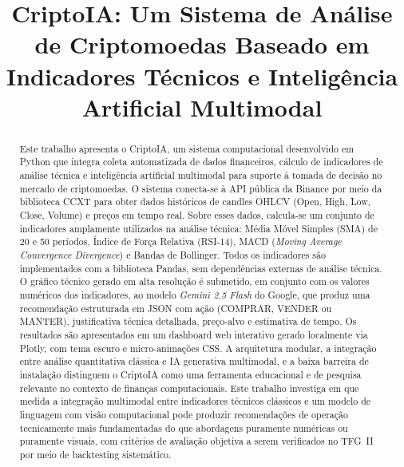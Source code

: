 \documentclass[conference]{IEEEtran}
\begin{document}
\title{CriptoIA: Um Sistema de Análise de Criptomoedas Baseado em\\
       Indicadores Técnicos e Inteligência Artificial Multimodal}

\author{
  \and
}

\maketitle

\begin{abstract}
Este trabalho apresenta o CriptoIA, um sistema computacional desenvolvido em Python que integra coleta automatizada de dados financeiros, cálculo de indicadores de análise técnica e inteligência artificial multimodal para suporte à tomada de decisão no mercado de criptomoedas. O sistema conecta-se à API pública da Binance por meio da biblioteca CCXT para obter dados históricos de candles OHLCV (Open, High, Low, Close, Volume) e preços em tempo real. Sobre esses dados, calcula-se um conjunto de indicadores amplamente utilizados na análise técnica: Média Móvel Simples (SMA) de 20 e 50 períodos, Índice de Força Relativa (RSI-14), MACD (\textit{Moving Average Convergence Divergence}) e Bandas de Bollinger. Todos os indicadores são implementados com a biblioteca Pandas, sem dependências externas de análise técnica. O gráfico técnico gerado em alta resolução é submetido, em conjunto com os valores numéricos dos indicadores, ao modelo \textit{Gemini 2.5 Flash} do Google, que produz uma recomendação estruturada em JSON com ação (COMPRAR, VENDER ou MANTER), justificativa técnica detalhada, preço-alvo e estimativa de tempo. Os resultados são apresentados em um dashboard web interativo gerado localmente via Plotly, com tema escuro e micro-animações CSS. A arquitetura modular, a integração entre análise quantitativa clássica e IA generativa multimodal, e a baixa barreira de instalação distinguem o CriptoIA como uma ferramenta educacional e de pesquisa relevante no contexto de finanças computacionais. Este trabalho investiga em que medida a integração multimodal entre indicadores técnicos clássicos e um modelo de linguagem com visão computacional pode produzir recomendações de operação tecnicamente mais fundamentadas do que abordagens puramente numéricas ou puramente visuais, com critérios de avaliação objetiva a serem verificados no TFG~II por meio de backtesting sistemático.
\end{abstract}
\end{document}
